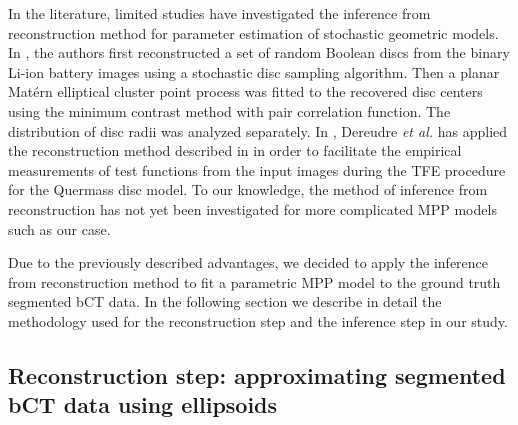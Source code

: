 \documentclass[journal]{IEEEtran}
\begin{document}
In the literature, limited studies have investigated the inference
from reconstruction method for parameter estimation of stochastic
geometric models. In \cite{thiedmann2011stochastic}, the authors first
reconstructed a set of random Boolean discs from the binary Li-ion
battery images using a stochastic disc sampling algorithm. Then a
planar Mat\'ern elliptical cluster point process was fitted to the
recovered disc centers using the minimum contrast method with pair
correlation function. The distribution of disc radii was analyzed
separately. In \cite{dereudre2014estimation}, Dereudre \textit{et al.}
has applied the reconstruction method described in
\cite{thiedmann2011stochastic} in order to facilitate the empirical
measurements of test functions from the input images during the TFE
procedure for the Quermass disc model. To our knowledge, the method of
inference from reconstruction has not yet been investigated for more
complicated MPP models such as our case.

Due to the previously described advantages, we decided to apply the
inference from reconstruction method to fit a parametric MPP model to
the ground truth segmented bCT data. In the following section we
describe in detail the methodology used for the reconstruction step
and the inference step in our study.

\subsection{Reconstruction step: approximating segmented bCT
  data using ellipsoids}
\label{sec:reconstr-step:-appr}
\end{document}

